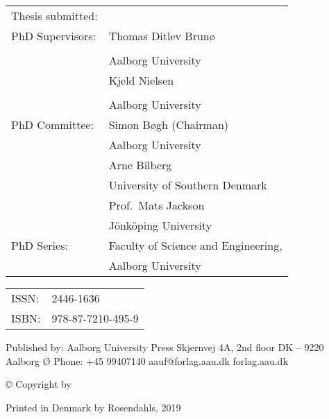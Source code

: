\thispagestyle{empty}
\noindent
\begin{tabularx}{\textwidth}{@{}lX}
    Thesis submitted:& \docSubmission{}\\[.5\baselineskip]
    PhD Supervisors:& \AProf{} Thomas Ditlev Brunø\\
                    & \Department{}\\
                    & Aalborg University\\[.5\baselineskip]
                    & \AProf{} Kjeld Nielsen\\
                    & \Department{}\\
                    & Aalborg University\\[.5\baselineskip]
    PhD Committee:  & \AProf{} Simon Bøgh (Chairman)\\
                    & Aalborg University\\[.5\baselineskip]
                    & \AProf{} Arne Bilberg\\ 
                    & University of Southern Denmark\\[.5\baselineskip]
                    & Prof.\ Mats Jackson\\ 
                    & Jönköping University\\[.5\baselineskip]
    PhD Series:& Faculty of Science and Engineering,\\
              & Aalborg University\\
\end{tabularx}

\strut\vfill
\noindent
\begin{tabularx}{\textwidth}{@{}lX}
    ISSN:\@ & 2446-1636\\
    ISBN:\@ & 978-87-7210-495-9\\
\end{tabularx}
\strut\vfill
\noindent Published by:\newline
Aalborg University Press\newline
Skjernvej 4A, 2nd floor\newline
DK – 9220 Aalborg Ø\newline
Phone: +45 99407140\newline
aauf@forlag.aau.dk\newline
forlag.aau.dk
\strut\vfill
\noindent \copyright{} Copyright by \docAuthor\newline
\strut\vfill
\noindent Printed in Denmark by Rosendahls, 2019
\clearpage